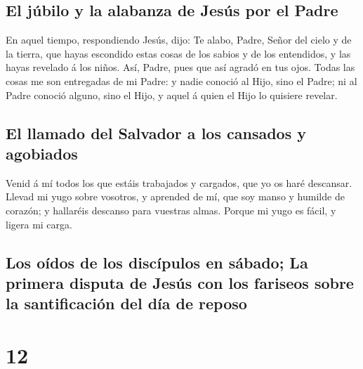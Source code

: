 \hypertarget{el-juxfabilo-y-la-alabanza-de-jesuxfas-por-el-padre}{%
\subsection{El júbilo y la alabanza de Jesús por el
Padre}\label{el-juxfabilo-y-la-alabanza-de-jesuxfas-por-el-padre}}

 En aquel tiempo, respondiendo Jesús, dijo: Te alabo,
Padre, Señor del cielo y de la tierra, que hayas escondido estas cosas
de los sabios y de los entendidos, y las hayas revelado á los niños.
 Así, Padre, pues que así agradó en tus ojos.
 Todas las cosas me son entregadas de mi Padre: y nadie
conoció al Hijo, sino el Padre; ni al Padre conoció alguno, sino el
Hijo, y aquel á quien el Hijo lo quisiere revelar.

\hypertarget{el-llamado-del-salvador-a-los-cansados-y-agobiados}{%
\subsection{El llamado del Salvador a los cansados
\hspace{0pt}\hspace{0pt}y
agobiados}\label{el-llamado-del-salvador-a-los-cansados-y-agobiados}}

 Venid á mí todos los que estáis trabajados y cargados,
que yo os haré descansar.  Llevad mi yugo sobre vosotros,
y aprended de mí, que soy manso y humilde de corazón; y hallaréis
descanso para vuestras almas.  Porque mi yugo es fácil, y
ligera mi carga.

\hypertarget{los-ouxeddos-de-los-discuxedpulos-en-suxe1bado-la-primera-disputa-de-jesuxfas-con-los-fariseos-sobre-la-santificaciuxf3n-del-duxeda-de-reposo}{%
\subsection{Los oídos de los discípulos en sábado; La primera disputa de
Jesús con los fariseos sobre la santificación del día de
reposo}\label{los-ouxeddos-de-los-discuxedpulos-en-suxe1bado-la-primera-disputa-de-jesuxfas-con-los-fariseos-sobre-la-santificaciuxf3n-del-duxeda-de-reposo}}

\hypertarget{section-40-12}{%
\section{12}\label{section-40-12}}


